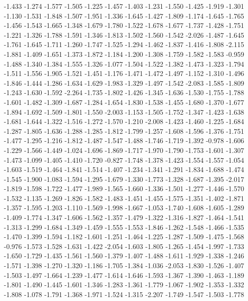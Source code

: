 \documentclass[9pt]{article}
\theoremstyle{plain}
\theoremstyle{definition}
\theoremstyle{remark}
\numberwithin{equation}{section}
\begin{document}
-1.433
-1.274
-1.577
-1.505
-1.225
-1.457
-1.403
-1.231
-1.550
-1.425
-1.919
-1.301
-1.130
-1.531
-1.848
-1.507
-1.951
-1.336
-1.645
-1.427
-1.809
-1.174
-1.645
-1.765
-1.456
-1.543
-1.665
-1.348
-1.679
-1.780
-1.522
-1.678
-1.677
-1.737
-1.428
-1.751
-1.221
-1.326
-1.788
-1.591
-1.346
-1.813
-1.502
-1.560
-1.542
-2.026
-1.487
-1.645
-1.761
-1.645
-1.711
-1.260
-1.747
-1.525
-1.294
-1.462
-1.837
-1.416
-1.808
-2.115
-1.881
-1.409
-1.651
-1.373
-1.872
-1.184
-1.200
-1.308
-1.759
-1.582
-1.583
-0.959
-1.488
-1.340
-1.384
-1.555
-1.326
-1.077
-1.504
-1.522
-1.382
-1.473
-1.323
-1.794
-1.511
-1.556
-1.905
-1.521
-1.451
-1.176
-1.471
-1.472
-1.497
-1.152
-1.310
-1.496
-1.846
-1.444
-1.286
-1.634
-1.629
-1.983
-1.329
-1.497
-1.542
-2.083
-1.585
-1.809
-1.243
-1.630
-1.592
-2.264
-1.735
-1.802
-1.426
-1.345
-1.636
-1.530
-1.755
-1.788
-1.601
-1.482
-1.309
-1.687
-1.284
-1.654
-1.830
-1.538
-1.455
-1.680
-1.370
-1.677
-1.894
-1.692
-1.509
-1.801
-1.550
-2.003
-1.153
-1.505
-1.752
-1.347
-1.423
-1.638
-1.681
-1.644
-1.322
-1.516
-1.272
-1.570
-1.210
-2.008
-1.423
-1.460
-1.225
-1.684
-1.287
-1.805
-1.636
-1.288
-1.285
-1.812
-1.799
-1.257
-1.608
-1.596
-1.376
-1.751
-1.477
-1.295
-1.216
-1.812
-1.487
-1.547
-1.488
-1.746
-1.719
-1.392
-0.978
-1.606
-1.229
-1.566
-1.449
-1.024
-1.696
-1.869
-1.717
-1.970
-1.790
-1.753
-1.601
-1.307
-1.473
-1.099
-1.405
-1.410
-1.720
-0.827
-1.748
-1.378
-1.423
-1.554
-1.557
-1.054
-1.603
-1.519
-1.464
-1.841
-1.514
-1.407
-1.234
-1.341
-1.291
-1.834
-1.688
-1.474
-1.545
-1.900
-1.083
-1.594
-1.295
-1.679
-1.330
-1.773
-1.328
-1.687
-1.395
-2.017
-1.819
-1.598
-1.722
-1.477
-1.989
-1.565
-1.660
-1.336
-1.501
-1.277
-1.446
-1.570
-1.532
-1.135
-1.269
-1.826
-1.582
-1.483
-1.451
-1.455
-1.575
-1.351
-1.402
-1.871
-1.357
-1.595
-1.203
-1.110
-1.569
-1.998
-1.667
-1.053
-1.740
-1.608
-1.605
-1.289
-1.409
-1.774
-1.347
-1.606
-1.562
-1.357
-1.479
-1.322
-1.316
-1.827
-1.464
-1.541
-1.313
-1.299
-1.684
-1.349
-1.459
-1.555
-1.553
-1.846
-1.262
-1.548
-1.466
-1.535
-1.470
-1.399
-1.594
-1.182
-1.601
-1.251
-1.464
-1.225
-1.287
-1.509
-1.475
-1.568
-0.976
-1.573
-1.528
-1.631
-1.422
-2.054
-1.603
-1.805
-1.265
-1.454
-1.997
-1.733
-1.650
-1.729
-1.435
-1.561
-1.560
-1.379
-1.407
-1.488
-1.611
-1.929
-1.338
-1.246
-1.571
-1.398
-1.270
-1.320
-1.186
-1.705
-1.384
-1.036
-2.053
-1.830
-1.526
-1.407
-1.503
-1.497
-1.664
-1.239
-1.477
-1.614
-1.646
-1.593
-1.367
-1.390
-1.463
-1.189
-1.801
-1.490
-1.445
-1.601
-1.346
-1.283
-1.361
-1.779
-1.067
-1.902
-1.353
-1.332
-1.808
-1.078
-1.791
-1.368
-1.971
-1.524
-1.315
-2.207
-1.749
-1.547
-1.503
-1.778
\end{document}
